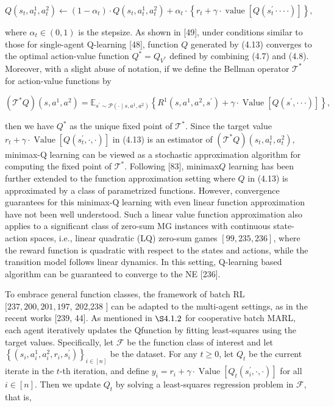 \documentclass[10pt]{article}
\begin{document}
\[
Q\left(s_{t}, a_{t}^{1}, a_{t}^{2}\right) \leftarrow\left(1-\alpha_{t}\right) \cdot Q\left(s_{t}, a_{t}^{1}, a_{t}^{2}\right)+\alpha_{t} \cdot\left\{r_{t}+\gamma \cdot \operatorname{value}\left[Q\left(s_{t}^{\prime} \cdot \cdot \cdot \cdot\right)\right]\right\},
\]

where $\alpha_{t} \in(0,1)$ is the stepsize. As shown in [49], under conditions similar to those for single-agent Q-learning [48], function $Q$ generated by (4.13) converges to the optimal action-value function $Q^{*}=Q_{V^{*}}$ defined by combining (4.7) and (4.8). Moreover, with a slight abuse of notation, if we define the Bellman operator $\mathcal{T}^{*}$ for action-value functions by

\[
\left(\mathcal{T}^{*} Q\right)\left(s, a^{1}, a^{2}\right)=\mathbb{E}_{s^{\prime} \sim \mathcal{P}\left(\cdot \mid s, a^{1}, a^{2}\right)}\left\{R^{1}\left(s, a^{1}, a^{2}, s^{\prime}\right)+\gamma \cdot \operatorname{Value}\left[Q\left(s^{\prime}, \cdot \cdot \cdot\right)\right]\right\},
\]

then we have $Q^{*}$ as the unique fixed point of $\mathcal{T}^{*}$. Since the target value $r_{t}+\gamma \cdot \operatorname{Value}\left[Q\left(s_{t}^{\prime}, \cdot, \cdot\right)\right]$ in (4.13) is an estimator of $\left(\mathcal{T}^{*} Q\right)\left(s_{t}, a_{t}^{1}, a_{t}^{2}\right)$, minimax-Q learning can be viewed as a stochastic approximation algorithm for computing the fixed point of $\mathcal{T}^{*}$. Following [83], minimax$Q$ learning has been further extended to the function approximation setting where $Q$ in (4.13) is approximated by a class of parametrized functions. However, convergence guarantees for this minimax-Q learning with even linear function approximation have not been well understood. Such a linear value function approximation also applies to a significant class of zero-sum MG instances with continuous state-action spaces, i.e., linear quadratic (LQ) zero-sum games $[99,235,236]$, where the reward function is quadratic with respect to the states and actions, while the transition model follows linear dynamics. In this setting, Q-learning based algorithm can be guaranteed to converge to the NE [236].

To embrace general function classes, the framework of batch RL $[237,200,201,197$, 202,238 ] can be adapted to the multi-agent settings, as in the recent works [239, 44]. As mentioned in $\S 4.1 .2$ for cooperative batch MARL, each agent iteratively updates the Qfunction by fitting least-squares using the target values. Specifically, let $\mathcal{F}$ be the function class of interest and let $\left\{\left(s_{i}, a_{i}^{1}, a_{i}^{2}, r_{i}, s_{i}^{\prime}\right)\right\}_{i \in[n]}$ be the dataset. For any $t \geq 0$, let $Q_{t}$ be the current iterate in the $t$-th iteration, and define $y_{i}=r_{i}+\gamma \cdot \operatorname{Value}\left[Q_{t}\left(s_{i}^{\prime}, \cdot, \cdot\right)\right]$ for all $i \in[n]$. Then we update $Q_{t}$ by solving a least-squares regression problem in $\mathcal{F}$, that is,
\end{document}
